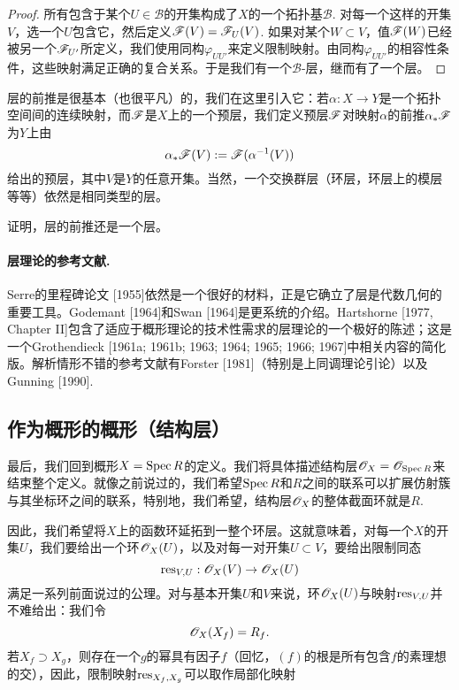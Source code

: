 \begin{proof}
	所有包含于某个$U\in\mathscr{B}$的开集构成了$X$的一个拓扑基$\mathscr{B}$. 对每一个这样的开集$V$，选一个$U$包含它，然后定义$\mathscr{F}(V)=\mathscr{F}_U(V)$. 如果对某个$W\subset V$，值$\mathscr{F}(W)$已经被另一个$\mathscr{F}_{U'}$所定义，我们使用同构$\varphi_{UU'}$来定义限制映射。由同构$\varphi_{UU'}$的相容性条件，这些映射满足正确的复合关系。于是我们有一个$\mathscr{B}$\hyp 层，继而有了一个层。
\end{proof}

层的前推是很基本（也很平凡）的，我们在这里引入它：若$\alpha:X\to Y$是一个拓扑空间间的连续映射，而$\mathscr{F}$是$X$上的一个预层，我们定义预层$\mathscr{F}$对映射$\alpha$的前推$\alpha_*\mathscr{F}$为$Y$上由
\[
	\alpha_*\mathscr{F}(V):=\mathscr{F}(\alpha^{-1}(V))
\]
给出的预层，其中$V$是$Y$的任意开集。当然，一个交换群层（环层，环层上的模层等等）依然是相同类型的层。

\begin{exe}
证明，层的前推还是一个层。
\end{exe}

\paragraph*{层理论的参考文献.}\label{ref:1} Serre的里程碑论文 [1955]依然是一个很好的材料，正是它确立了层是代数几何的重要工具。Godemant [1964]和Swan [1964]是更系统的介绍。Hartshorne [1977, Chapter II]包含了适应于概形理论的技术性需求的层理论的一个极好的陈述；这是一个Grothendieck [1961a; 1961b; 1963; 1964; 1965; 1966; 1967]中相关内容的简化版。解析情形不错的参考文献有Forster [1981]（特别是上同调理论引论）以及Gunning [1990].

\subsection{作为概形的概形（结构层）}

最后，我们回到概形$X=\operatorname{Spec} R$的定义。我们将具体描述结构层$\mathscr{O}_X=\mathscr{O}_{\operatorname{Spec} R}$来结束整个定义。就像之前说过的，我们希望$\operatorname{Spec} R$和$R$之间的联系可以扩展仿射簇与其坐标环之间的联系，特别地，我们希望，结构层$\mathscr{O}_X$的整体截面环就是$R$.

因此，我们希望将$X$上的函数环延拓到一整个环层。这就意味着，对每一个$X$的开集$U$，我们要给出一个环$\mathscr{O}_X(U)$，以及对每一对开集$U\subset V$，要给出限制同态
\[
	\operatorname{res}_{V,U}:\mathscr{O}_X(V)\to \mathscr{O}_X(U)
\]
满足一系列前面说过的公理。对与基本开集$U$和$V$来说，环$\mathscr{O}_X(U)$与映射$\operatorname{res}_{V,U}$并不难给出：我们令
\[
	\mathscr{O}_X(X_f)=R_f.
\]
若$X_f\supset X_g$，则存在一个$g$的幂具有因子$f$（回忆，$(f)$的根是所有包含$f$的素理想的交），因此，限制映射$\operatorname{res}_{X_f,X_g}$可以取作局部化映射%

